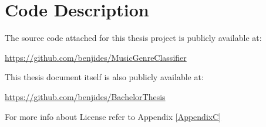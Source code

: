 
\chapter{Code Description}

\label{AppendixA}

The source code attached for this thesis project is publicly available at:

\url{https://github.com/benjides/MusicGenreClassifier}

This thesis document itself is also publicly available at:

\url{https://github.com/benjides/BachelorThesis}

For more info about License refer to Appendix \ref{AppendixC}
